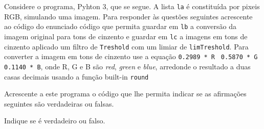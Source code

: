 \documentclass[12pt,varwidth=16cm,border=1pt]{standalone}
\begin{document}
Considere o programa, Pyhton 3, que se segue. A lista \verb+la+ é constituída por pixeis RGB, simulando uma imagem. Para responder às questões seguintes acrescente ao código do enunciado código que permita guardar em \verb+lb+ a conversão da imagem original para tons de cinzento e guardar em \verb+lc+ a imagens em tons de cinzento aplicado um filtro de \verb+Treshold+ com um limiar de \verb+limTreshold+. Para converter a imagem em tons de cinzento use a equação \verb+0.2989 * R + \verb+0.5870 * G + \verb+0.1140 * B+, onde R, G e B são \textit{red}, \textit{green} e \textit{blue}, arredonde o resultado a duas casas decimais usando a função built-in \verb+round+



Acrescente a este programa o código que lhe permita indicar se as
afirmações seguintes são verdadeiras ou falsas.

Indique se é verdadeiro ou falso.
\end{document}
